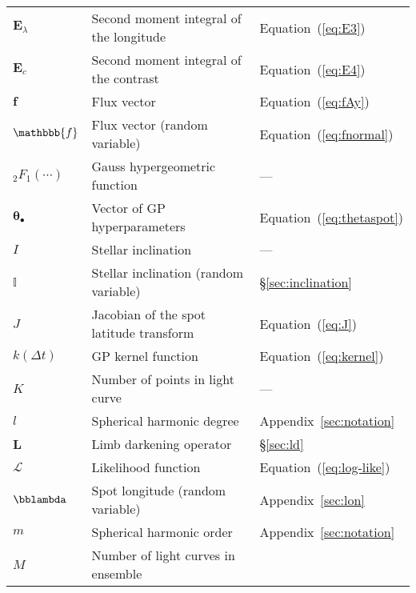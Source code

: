 \begin{center}
\begin{longtable}{W{c}{1cm} W{l}{9cm} W{l}{2cm}}
        $\mathbf{E}_\lambda$
         & Second moment integral of the longitude
         & Equation~(\ref{eq:E3})
        \\
        $\mathbf{E}_c$
         & Second moment integral of the contrast
         & Equation~(\ref{eq:E4})
        \\
        $\mathbf{f}$
         & Flux vector
         & Equation~(\ref{eq:fAy})
        \\
        $\mathbbb{f}$
         & Flux vector (random variable)
         & Equation~(\ref{eq:fnormal})
        \\
        ${_2}F_1(\cdots)$
         & Gauss hypergeometric function
         & ---
        \\
        $\pmb{\theta}_\bullet$
         & Vector of GP hyperparameters
         & Equation~(\ref{eq:thetaspot})
        \\
        $I$
         & Stellar inclination
         & ---
        \\
        $\mathbb{I}$
         & Stellar inclination (random variable)
         & \S\ref{sec:inclination}
        \\
        $J$
         & Jacobian of the spot latitude transform
         & Equation~(\ref{eq:J})
        \\
        $k(\Delta t)$
         & GP kernel function
         & Equation~(\ref{eq:kernel})
        \\
        $K$
         & Number of points in light curve
         & ---
        \\
        $l$
         & Spherical harmonic degree
         & Appendix~\ref{sec:notation}
        \\
        $\mathbf{L}$
         & Limb darkening operator
         & \S\ref{sec:ld}
        \\
        $\mathcal{L}$
         & Likelihood function
         & Equation~(\ref{eq:log-like})
        \\
        $\bblambda$
         & Spot longitude (random variable)
         & Appendix~\ref{sec:lon}
        \\
        \pagebreak %
        $m$
         & Spherical harmonic order
         & Appendix~\ref{sec:notation}
        \\
        $M$
         & Number of light curves in ensemble

\end{longtable}
\end{center}
